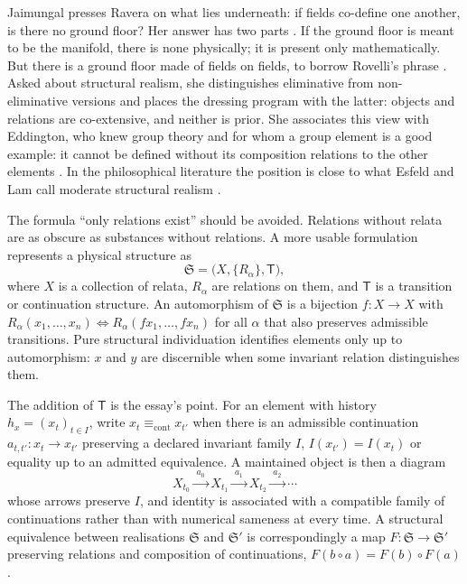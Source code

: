 \documentclass[11pt]{article}
\theoremstyle{plain}
\theoremstyle{definition}
\theoremstyle{remark}
\begin{document}
Jaimungal presses Ravera on what lies underneath: if fields co-define one another, is there no ground floor? Her answer has two parts \cite{toe}. If the ground floor is meant to be the manifold, there is none physically; it is present only mathematically. But there is a ground floor made of fields on fields, to borrow Rovelli's phrase \cite{rovelli-qg}. Asked about structural realism, she distinguishes eliminative from non-eliminative versions and places the dressing program with the latter: objects and relations are co-extensive, and neither is prior. She associates this view with Eddington, who knew group theory and for whom a group element is a good example: it cannot be defined without its composition relations to the other elements \cite{eddington,ladyman}. In the philosophical literature the position is close to what Esfeld and Lam call moderate structural realism \cite{esfeld-lam}.

The formula ``only relations exist'' should be avoided. Relations without relata are as obscure as substances without relations. A more usable formulation represents a physical structure as
\begin{equation}
\mathfrak S=\big(X,\{R_\alpha\},\mathsf T\big),
\end{equation}
where $X$ is a collection of relata, $R_\alpha$ are relations on them, and $\mathsf T$ is a transition or continuation structure. An automorphism of $\mathfrak S$ is a bijection $f:X\to X$ with $R_\alpha(x_1,\dots,x_n)\Leftrightarrow R_\alpha(fx_1,\dots,fx_n)$ for all $\alpha$ that also preserves admissible transitions. Pure structural individuation identifies elements only up to automorphism: $x$ and $y$ are discernible when some invariant relation distinguishes them.

The addition of $\mathsf T$ is the essay's point. For an element with history $h_x=(x_t)_{t\in I}$, write $x_t\equiv_{\mathrm{cont}}x_{t'}$ when there is an admissible continuation $a_{t,t'}:x_t\to x_{t'}$ preserving a declared invariant family $I$, $I(x_{t'})=I(x_t)$ or equality up to an admitted equivalence. A maintained object is then a diagram
\begin{equation}
X_{t_0}\xrightarrow{\;a_0\;}X_{t_1}\xrightarrow{\;a_1\;}X_{t_2}\xrightarrow{\;a_2\;}\cdots
\end{equation}
whose arrows preserve $I$, and identity is associated with a compatible family of continuations rather than with numerical sameness at every time. A structural equivalence between realisations $\mathfrak S$ and $\mathfrak S'$ is correspondingly a map $F:\mathfrak S\to\mathfrak S'$ preserving relations and composition of continuations, $F(b\circ a)=F(b)\circ F(a)$.
\end{document}

